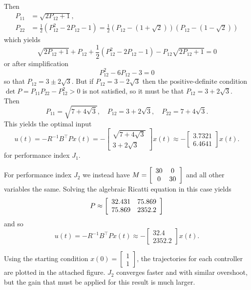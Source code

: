 \documentclass{article}
\begin{document}
Then
\begin{align*}
P_{11} &= \sqrt{2 P_{12} + 1}, \\
P_{22} &= \frac{1}{2} (P_{12}^2 - 2 P_{12} - 1)
       = \frac{1}{2} (P_{12} - (1 + \sqrt{2}))(P_{12} - (1 - \sqrt{2}))
\end{align*}
which yields
$$
\sqrt{2 P_{12} + 1}
+ P_{12}
+ \frac{1}{2}(P_{12}^2 - 2P_{12} - 1)
- P_{12} \sqrt{2 P_{12} + 1} = 0
$$
or after simplification
$$
P_{12}^2 - 6P_{12} - 3 = 0
$$
so that $P_{12} = 3 \pm 2 \sqrt{3}$. But if
$P_{12} = 3 - 2\sqrt{3}$ then the positive-definite condition
$\det P = P_{11} P_{22} - P_{12}^2 > 0$ is not satisfied, so it must
be that $P_{12} = 3 + 2 \sqrt{3}$. Then
$$
P_{11} = \sqrt{7 + 4\sqrt{3}}, \quad
P_{12} = 3 + 2\sqrt{3}, \quad
P_{22} = 7 + 4\sqrt{3}.
$$
This yields the optimal input
$$
u(t)
 = -R^{-1} B^\top P x(t)
 = -\left[\begin{array}{c}
      \sqrt{7 + 4\sqrt{3}} \\
      3 + 2 \sqrt{3}
    \end{array}\right] x(t)
 \approx
   -\left[\begin{array}{c}
       3.7321 \\
       6.4641
    \end{array}\right] x(t).
$$
for performance index $J_1$.

For performance index $J_2$ we instead have
$M = \left[\begin{array}{c c}
       30 &  0 \\
       0  & 30
     \end{array}\right]$
and all other variables the same. Solving the algebraic Ricatti
equation in this case yields
$$
P \approx
  \left[\begin{array}{c c}
    32.431 & 75.869 \\
    75.869 & 2352.2
  \end{array}\right]
$$
and so
$$
u(t)
 = -R^{-1} B^\top P x(t)
 \approx
   -\left[\begin{array}{c}
        32.4 \\
      2352.2
    \end{array}\right] x(t).
$$

Using the starting condition
$x(0) = \left[\begin{array}{c}
          1 \\ 1
        \end{array}\right]$, the trajectories for each controller are
plotted in the attached figure. $J_2$ converges faster and
with similar overshoot, but the gain that must be applied for this
result is much larger.
\end{document}
